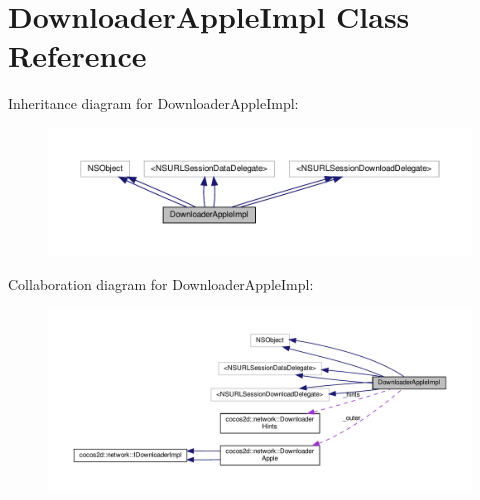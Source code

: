 \hypertarget{interfaceDownloaderAppleImpl}{}\section{Downloader\+Apple\+Impl Class Reference}
\label{interfaceDownloaderAppleImpl}


Inheritance diagram for Downloader\+Apple\+Impl\+:
\nopagebreak
\begin{figure}[H]
\begin{center}
\leavevmode
\includegraphics[width=350pt]{interfaceDownloaderAppleImpl__inherit__graph}
\end{center}
\end{figure}


Collaboration diagram for Downloader\+Apple\+Impl\+:
\nopagebreak
\begin{figure}[H]
\begin{center}
\leavevmode
\includegraphics[width=350pt]{interfaceDownloaderAppleImpl__coll__graph}
\end{center}
\end{figure}
